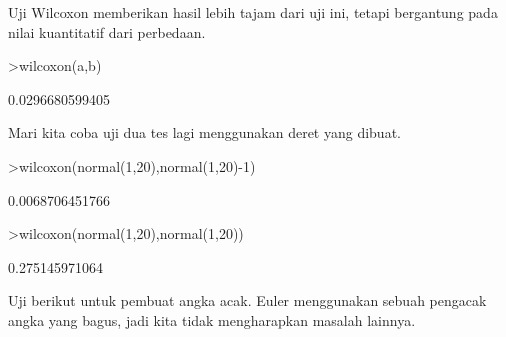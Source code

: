 \documentclass[a4paper,10pt]{article}
\begin{document}
\begin{eulernotebook}
\begin{eulercomment}
\begin{eulercomment}
\begin{eulercomment}
Uji Wilcoxon memberikan hasil lebih tajam dari uji ini, tetapi
bergantung pada nilai kuantitatif dari perbedaan.
\end{eulercomment}
\begin{eulerprompt}
>wilcoxon(a,b)
\end{eulerprompt}
\begin{euleroutput}
  0.0296680599405
\end{euleroutput}
\begin{eulercomment}
Mari kita coba uji dua tes lagi menggunakan deret yang dibuat.
\end{eulercomment}
\begin{eulerprompt}
>wilcoxon(normal(1,20),normal(1,20)-1)
\end{eulerprompt}
\begin{euleroutput}
  0.0068706451766
\end{euleroutput}
\begin{eulerprompt}
>wilcoxon(normal(1,20),normal(1,20))
\end{eulerprompt}
\begin{euleroutput}
  0.275145971064
\end{euleroutput}
\begin{eulercomment}
Uji berikut untuk pembuat angka acak. Euler menggunakan sebuah
pengacak angka yang bagus, jadi kita tidak mengharapkan masalah
lainnya.


\end{eulercomment}
\end{eulercomment}
\end{eulercomment}
\end{eulernotebook}
\end{document}
